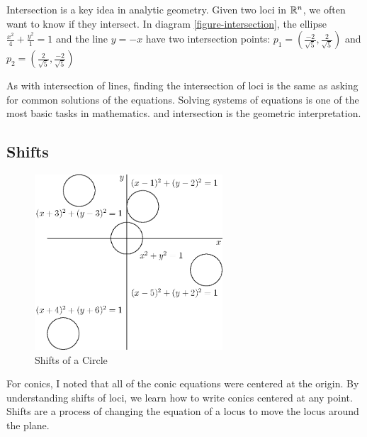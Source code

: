 \documentclass[fleqn]{report}
\begin{document}
Intersection is a key idea in analytic geometry. Given two
loci in $\mathbb{R}^n$, we often want to know if they intersect.
In diagram \ref{figure-intersection}, the
ellipse $\frac{x^2}{4} + \frac{y^2}{1} = 1 $ and
the line $y=-x$ have two intersection points:
$p_1 = (\frac{-2}{\sqrt{5}},\frac{2}{\sqrt{5}})$ and
$p_2 = (\frac{2}{\sqrt{5}},\frac{-2}{\sqrt{5}})$ 

As with intersection of lines, finding the intersection of
loci is the same as asking for common solutions of the 
equations. Solving systems of equations is one of the most
basic tasks in mathematics. and intersection is the geometric
interpretation.

\subsection{Shifts}
\label{shifts}

\begin{figure}[t]
\centering
\includegraphics[width=7cm]{figure25.eps}
\caption{Shifts of a Circle}
\label{figure-shifts-circle}
\end{figure}

For conics, I noted that all of the conic equations were
centered at the origin. By understanding shifts of loci, we
learn how to write conics centered at any point. Shifts are a
process of changing the equation of a locus to move the locus
around the plane. 
\end{document}
